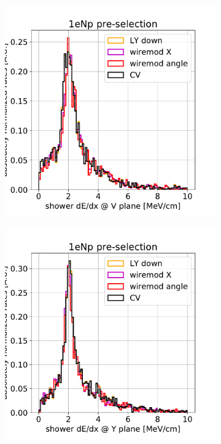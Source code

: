 \documentclass[a4paper]{article}
\begin{document}
\begin{figure}[H]
\begin{center}
\begin{subfigure}[b]{0.3\textwidth}
    \includegraphics[width=1.00\textwidth]{detsys/shr_tkfit_dedx_V01162020_eLEE_low.pdf}
    \end{subfigure}
    \begin{subfigure}[b]{0.3\textwidth}
    \centering
    \includegraphics[width=1.00\textwidth]{detsys/shr_tkfit_dedx_Y01162020_eLEE_low.pdf}

\end{subfigure}
\end{center}
\end{figure}
\end{document}
